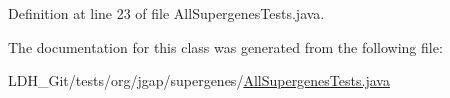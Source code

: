 Definition at line 23 of file All\-Supergenes\-Tests.\-java.



The documentation for this class was generated from the following file\-:\begin{DoxyCompactItemize}
\item 
L\-D\-H\-\_\-\-Git/tests/org/jgap/supergenes/\hyperlink{_all_supergenes_tests_8java}{All\-Supergenes\-Tests.\-java}\end{DoxyCompactItemize}
